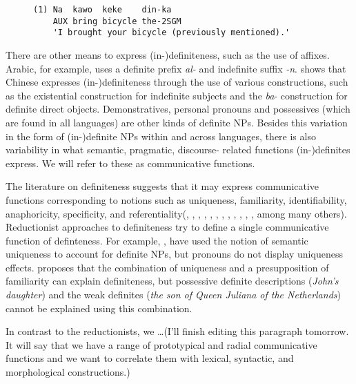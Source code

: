 \documentclass[11pt,letterpaper]{article}
\begin{document}
\begin{figure}[htbp]
\vspace*{0.1cm}
\begin{footnotesize}
\begin{verbatim}
(1) Na  kawo  keke    din-ka 
    AUX bring bicycle the-2SGM 	
    'I brought your bicycle (previously mentioned).' 
\end{verbatim}
\end{footnotesize}
\label{fig:hausaanaphdef}
\end{figure}

There are other means to express (in-)definiteness, such as the use of affixes.   Arabic, for example, uses a definite prefix {\it al-} and indefinite suffix {\it -n}. \cite{chen04} shows that Chinese expresses (in-)definiteness through the use of various constructions, such as the existential construction for indefinite subjects and the {\it ba}- construction for definite direct objects. Demonstratives, personal pronouns and possessives (which are found in all languages) are other kinds of definite NPs. Besides this variation in the form of (in-)definite NPs within and across languages, there is also variability in what semantic, pragmatic, discourse- related functions (in-)definites express.   We will refer to these as communicative functions. 

The literature on definiteness suggests that it may express communicative functions corresponding to notions such as uniqueness, familiarity, identifiability, anaphoricity, specificity, and referentiality(\cite{birner94}, \cite{condoravdi92}, \cite{evans77}, \cite{evans80}, \cite{gundel88}, \cite{gundel93}, \cite{heim90}, \cite{kadmon87}, \cite{kadmon90}, \cite{lyons99}, \cite{prince92}, \cite{roberts03}, \cite{russell05} among many others).  Reductionist approaches to definiteness try to define a single communicative function of definteness.   For example, \cite{kadmon87}, \cite{evans80} have used the notion of semantic uniqueness to account for definite NPs, but pronouns do not display uniqueness effects. \cite{roberts03} proposes that the combination of uniqueness and a presupposition of familiarity can explain definiteness, but possessive definite descriptions ({\it John's daughter}) and the weak definites ({\it the son of Queen Juliana of the Netherlands}) cannot be explained using this combination.


In contrast to the reductionists, we …(I’ll finish editing this paragraph tomorrow.   It will say that we have a range of prototypical and radial communicative functions and we want to correlate them with lexical, syntactic, and morphological constructions.)
\end{document}

